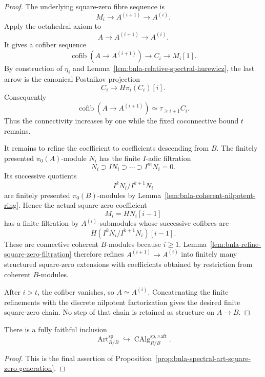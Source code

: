 \begin{proof}
The underlying square-zero fibre sequence is
\[
    M_i
    \longrightarrow
    A^{(i+1)}
    \longrightarrow
    A^{(i)}.
\]
Apply the octahedral axiom to
\[
    A\longrightarrow A^{(i+1)}
    \longrightarrow A^{(i)}.
\]
It gives a cofiber sequence
\[
    \operatorname{cofib}(A\to A^{(i+1)})
    \longrightarrow
    C_i
    \longrightarrow
    M_i[1].
\]
By construction of $\eta_i$ and
Lemma~\ref{lem:bnla-relative-spectral-hurewicz}, the last arrow is the
canonical Postnikov projection
\[
    C_i\longrightarrow H\pi_i(C_i)[i].
\]
Consequently
\[
    \boxed{
    \operatorname{cofib}(A\to A^{(i+1)})
    \simeq
    \tau_{\geq i+1}C_i.}
\]
Thus the connectivity increases by one while the fixed coconnective bound
$t$ remains.

It remains to refine the coefficient to coefficients descending from $B$.
The finitely presented $\pi_0(A)$-module $N_i$ has the finite $I$-adic
filtration
\[
    N_i\supset IN_i\supset\cdots\supset I^mN_i=0.
\]
Its successive quotients
\[
    I^kN_i/I^{k+1}N_i
\]
are finitely presented $\pi_0(B)$-modules by
Lemma~\ref{lem:bnla-coherent-nilpotent-ring}.  Hence the actual square-zero
coefficient
\[
    M_i=HN_i[i-1]
\]
has a finite filtration by $A^{(i)}$-submodules whose successive cofibres are
\[
    H\!\left(I^kN_i/I^{k+1}N_i\right)[i-1].
\]
These are connective coherent $B$-modules because $i\geq1$.
Lemma~\ref{lem:bnla-refine-square-zero-filtration} therefore refines
$A^{(i+1)}\to A^{(i)}$ into finitely many structured square-zero extensions
with coefficients obtained by restriction from coherent $B$-modules.

After $i>t$, the cofiber vanishes, so $A\simeq A^{(i)}$.  Concatenating the
finite refinements with the discrete nilpotent factorization gives the
desired finite square-zero chain.  No step of that chain is retained as
structure on $A\to B$.
\end{proof}

\begin{corollary}
\label{cor:bnla-art-complete-aft}
There is a fully faithful inclusion
\[
    \operatorname{Art}^{\mathrm{sp}}_{R/B}
    \hookrightarrow
    \operatorname{CAlg}^{\mathrm{sp},\wedge\mathrm{aft}}_{R/B}.
\]
\end{corollary}

\begin{proof}
This is the final assertion of
Proposition~\ref{prop:bnla-spectral-art-square-zero-generation}.
\end{proof}

